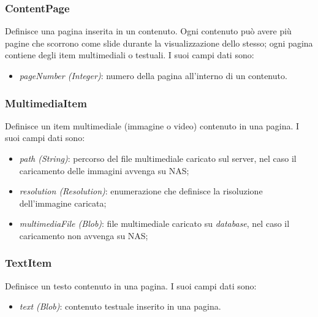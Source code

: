 \subsubsection{ContentPage}
Definisce una pagina inserita in un contenuto. Ogni contenuto può avere più pagine che scorrono come slide durante la visualizzazione dello stesso; ogni pagina contiene degli item multimediali o testuali. I suoi campi dati sono:
\begin{itemize}
    \item \textit{pageNumber (Integer)}: numero della pagina all’interno di un contenuto.
\end{itemize}

\subsubsection{MultimediaItem}
Definisce un item multimediale (immagine o video) contenuto in una pagina. I suoi campi dati sono:
\begin{itemize}
    \item \textit{path (String)}: percorso del file multimediale caricato sul server, nel caso il caricamento delle immagini avvenga su NAS;
    \item \textit{resolution (Resolution)}: enumerazione che definisce la risoluzione dell'immagine caricata;
    \item \textit{multimediaFile (Blob)}: file multimediale caricato su \textit{database}, nel caso il caricamento non avvenga su NAS;
\end{itemize}

\subsubsection{TextItem}
Definisce un testo contenuto in una pagina. I suoi campi dati sono:
\begin{itemize}
    \item \textit{text (Blob)}: contenuto testuale inserito in una pagina.
\end{itemize}

